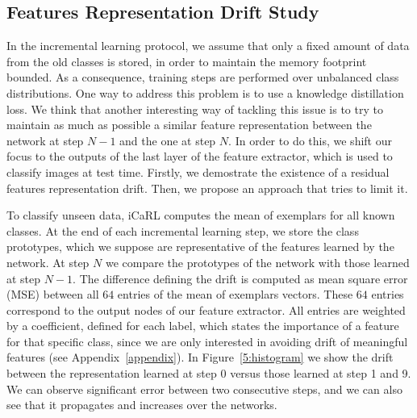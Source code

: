 \documentclass[10pt,twocolumn,letterpaper]{article}
\begin{document}
\subsection{Features Representation Drift Study}
\label{frds}
In the incremental learning protocol, we assume that only a fixed amount of data from the old classes is stored, in order to maintain the memory footprint bounded. As a consequence, training steps are performed over unbalanced class distributions. One way to address this problem is to use a knowledge distillation loss. We think that another interesting way of tackling this issue is to try to maintain as much as possible a similar feature representation between the network at step $N-1$ and the one at step $N$. In order to do this, we shift our focus to the outputs of the last layer of the feature extractor, which is used to classify images at test time. Firstly, we demostrate the existence of a residual features representation drift. Then, we propose an approach that tries to limit it.

To classify unseen data, iCaRL computes the mean of exemplars for all known classes. At the end of each incremental learning step, we store the class prototypes, which we suppose are representative of the features learned by the network. At step $N$ we compare the prototypes of the network with those learned at step $N-1$. The difference defining the drift is computed as mean square error (MSE) between all $64$ entries of the mean of exemplars vectors. These $64$ entries correspond to the output nodes of our feature extractor. All entries are weighted by a coefficient, defined for each label, which states the importance of a feature for that specific class, since we are only interested in avoiding drift of meaningful features (see Appendix~\ref{appendix}). In Figure~\ref{5:histogram} we show the drift between the representation learned at step 0 versus those learned at step 1 and 9. We can observe significant error between two consecutive steps, and we can also see that it propagates and increases over the networks.
\end{document}
